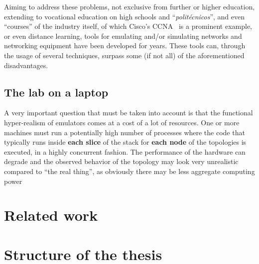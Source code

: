 Aiming to address these problems, not exclusive from further or higher education, extending to vocational education on high schools and ``\emph{politécnicos}'', and even ``courses'' of the industry itself, of which Cisco's CCNA~\cite{ccna} is a prominent example, or even distance learning, tools for emulating and/or simulating networks and networking equipment have been developed for years. %
These tools can, through the usage of several techniques, surpass some (if not all) of the aforementioned disadvantages.

\subsection{The lab on a laptop}
\label{subsec:thelabonalaptop}

A very important question that must be taken into account is that the functional hyper-realism of emulators comes at a cost of a lot of resources.
One or more machines must run a potentially high number of processes where the code that typically runs inside \textbf{each slice} of the stack for \textbf{each node} of the topologies is executed, in a highly concurrent fashion.
The performance of the hardware can degrade and the observed behavior of the topology may look very unrealistic compared to ``the real thing'', as obviously there may be less aggregate computing power

\section{Related work}
\label{sec:relatedwork}

\section{Structure of the thesis}
\label{sec:structure}

